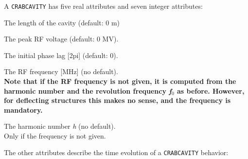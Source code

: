 A {\tt CRABCAVITY} has five real attributes and seven integer attributes: 

\begin{madlist}
   The length of the cavity (default: 0 m) 

   The peak RF voltage (default: 0 MV). 

   The initial phase lag [2pi] (default: 0). 

   The RF frequency [MHz] (no default). \\[3mm]
    {\bf Note that if the RF frequency is not given, it is computed from the
    harmonic number and the revolution frequency \textit{f$_0$} as before. 
    However, for deflecting structures this makes no sense, and the 
    frequency is mandatory.} 

   The harmonic number \textit{h} (no default). \\
  Only if the frequency is not given. 

\end{madlist}

The other attributes describe the time evolution of a {\tt CRABCAVITY} behavior:

